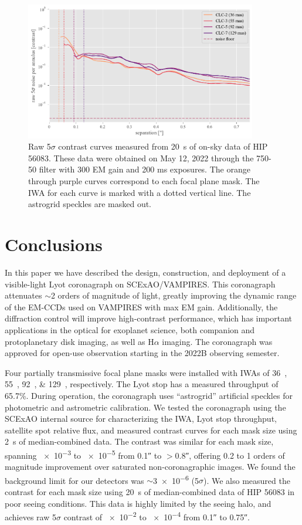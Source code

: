 \documentclass[]{spie}  %
\begin{document}
\begin{figure}
   \centering
   \includegraphics[width=0.9\textwidth]{figures/HIP56083_20220512_curves}
   \caption{Raw 5$\sigma$ contrast curves measured from \qty{20}{\second} of on-sky data of HIP 56083. These data were obtained on May 12, 2022 through the 750-50 filter with 300 EM gain and 200 ms exposures. The orange through purple curves correspond to each focal plane mask. The IWA for each curve is marked with a dotted vertical line. The astrogrid speckles are masked out.}\label{fig:onsky-contrast}
\end{figure}

\section{Conclusions}\label{sec:conclusions}

In this paper we have described the design, construction, and deployment of a visible-light Lyot coronagraph on SCExAO/VAMPIRES. This coronagraph attenuates $\sim$2 orders of magnitude of light, greatly improving the dynamic range of the EM-CCDs used on VAMPIRES with max EM gain. Additionally, the diffraction control will improve high-contrast performance, which has important applications in the optical for exoplanet science, both companion and protoplanetary disk imaging, as well as H$\alpha$ imaging. The coronagraph was approved for open-use observation starting in the 2022B observing semester.

Four partially transmissive focal plane masks were installed with IWAs of \qtylist{36;55;92;129}{\milliarcsecond}, respectively. The Lyot stop has a measured throughput of 65.7\%. During operation, the coronagraph uses ``astrogrid'' artificial speckles for photometric and astrometric calibration. We tested the coronagraph using the SCExAO internal source for characterizing the IWA, Lyot stop throughput, satellite spot relative flux, and measured contrast curves for each mask size using \qty{2}{\second} of median-combined data. The contrast was similar for each mask size, spanning \num{e-3} to \num{e-5} from \ang{;;0.1} to $>$\ang{;;0.8}, offering 0.2 to 1 orders of magnitude improvement over saturated non-coronagraphic images. We found the background limit for our detectors was $\sim$\num{3e-6} (5$\sigma$). We also measured the contrast for each mask size using \qty{20}{\second} of median-combined data of HIP 56083 in poor seeing conditions. This data is highly limited by the seeing halo, and achieves raw 5$\sigma$ contrast of \num{e-2} to \num{e-4} from \ang{;;0.1} to \ang{;;0.75}.
\end{document}
